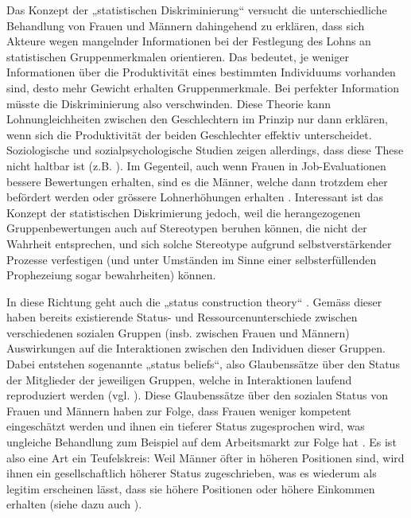 \documentclass[a4paper,12pt]{article}
\renewcommand{\baselinestretch}{1.1}
\newif\ifcomments
\newcommand{\comment}[1]{%
    \ifcomments\marginpar{\renewcommand{\baselinestretch}{1}\tiny\hspace*{-1.1em}\colorbox{gray!20}%
    {\textcolor{red}{\parbox[t]{.9in}{\raggedright #1}}}}\fi}
\begin{document}
Das Konzept der „statistischen Diskriminierung“ \citep{Phelps-1972} versucht
die unterschiedliche Behandlung von Frauen und Männern dahingehend zu erklären,
dass sich Akteure wegen mangelnder Informationen bei der Festlegung des Lohns
an statistischen Gruppenmerkmalen orientieren. Das bedeutet, je weniger Informationen über die Produktivität eines bestimmten Individuums vorhanden sind, desto mehr Gewicht erhalten Gruppenmerkmale. Bei perfekter Information müsste die Diskriminierung also verschwinden. Diese Theorie kann
Lohnungleichheiten zwischen den Geschlechtern im Prinzip nur dann erklären, wenn
sich die Produktivität der beiden Geschlechter effektiv unterscheidet. Soziologische und
sozialpsychologische Studien zeigen allerdings, dass diese These nicht haltbar
ist (z.B. \citealp{Bielby-Bielby-1988}). Im Gegenteil, auch wenn Frauen in
Job-Evaluationen bessere Bewertungen erhalten, sind es die Männer, welche dann
trotzdem eher befördert werden \citep{Blau-DeVaro-2007} oder grössere
Lohnerhöhungen erhalten \citep{Castilla-2012}. Interessant ist das Konzept der 
statistischen Diskrimierung jedoch, weil die herangezogenen Gruppenbewertungen auch auf 
Stereotypen beruhen können, die nicht der Wahrheit 
entsprechen, und sich solche Stereotype aufgrund selbstverstärkender Prozesse 
verfestigen (und unter Umständen im Sinne einer selbsterfüllenden Prophezeiung 
sogar bewahrheiten) können.

In diese Richtung geht auch die „status construction theory“
\citep{Ridgeway-1997,Ridgeway-2001}. Gemäss dieser haben bereits existierende Status- und
Ressourcenunterschiede zwischen verschiedenen sozialen Gruppen (insb. zwischen
Frauen und Männern) Auswirkungen auf die Interaktionen zwischen den Individuen
dieser Gruppen. Dabei entstehen sogenannte „status beliefs“, also Glaubenssätze
über den Status der Mitglieder der jeweiligen Gruppen, welche in Interaktionen
laufend reproduziert werden (vgl. \citealp{Goffman-1977}). Diese Glaubenssätze
über den sozialen Status von Frauen und Männern haben zur Folge, dass Frauen
weniger kompetent eingeschätzt werden und ihnen ein tieferer Status
zugesprochen wird, was ungleiche Behandlung zum Beispiel auf dem Arbeitsmarkt
zur Folge hat \citep{Ridgeway-1997}. Es ist also eine Art ein Teufelskreis:
Weil Männer öfter in höheren Positionen sind, wird ihnen ein gesellschaftlich
höherer Status zugeschrieben, was es wiederum als legitim erscheinen lässt,
dass sie höhere Positionen oder höhere Einkommen erhalten (siehe dazu auch
\citealp{Berger-etal-1972}). 

\comment{Abschnitt zu Segregation \& Devaluation hier (siehe comment unten)?}
\end{document}
